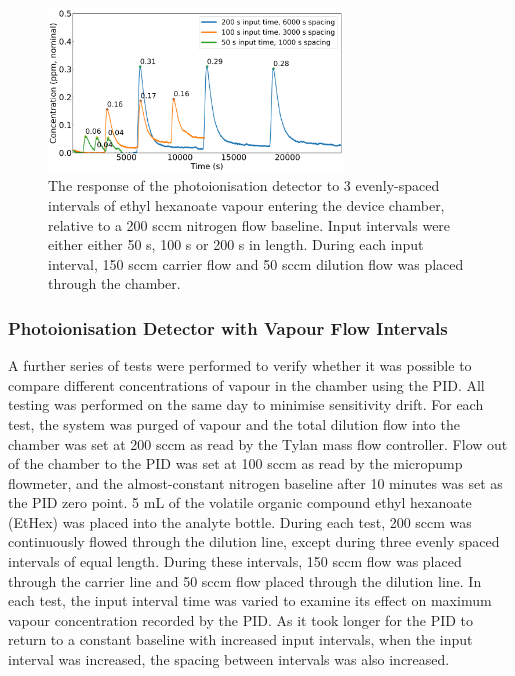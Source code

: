 \documentclass[
  a4paper,
]{scrbook}
\begin{document}
\begin{figure}

{\centering \includegraphics[width=0.7\textwidth,height=\textheight]{figures/ch5/input_time_comparison.png}

}

\caption{\label{fig-concentration-comparison}The response of the
photoionisation detector to 3 evenly-spaced intervals of ethyl hexanoate
vapour entering the device chamber, relative to a 200 sccm nitrogen flow
baseline. Input intervals were either either 50 s, 100 s or 200 s in
length. During each input interval, 150 sccm carrier flow and 50 sccm
dilution flow was placed through the chamber.}

\end{figure}

\hypertarget{photoionisation-detector-with-vapour-flow-intervals}{%
\subsubsection*{Photoionisation Detector with Vapour Flow
Intervals}\label{photoionisation-detector-with-vapour-flow-intervals}}

A further series of tests were performed to verify whether it was
possible to compare different concentrations of vapour in the chamber
using the PID. All testing was performed on the same day to minimise
sensitivity drift. For each test, the system was purged of vapour and
the total dilution flow into the chamber was set at 200 sccm as read by
the Tylan mass flow controller. Flow out of the chamber to the PID was
set at 100 sccm as read by the micropump flowmeter, and the
almost-constant nitrogen baseline after 10 minutes was set as the PID
zero point. 5 mL of the volatile organic compound ethyl hexanoate
(EtHex) was placed into the analyte bottle. During each test, 200 sccm
was continuously flowed through the dilution line, except during three
evenly spaced intervals of equal length. During these intervals, 150
sccm flow was placed through the carrier line and 50 sccm flow placed
through the dilution line. In each test, the input interval time was
varied to examine its effect on maximum vapour concentration recorded by
the PID. As it took longer for the PID to return to a constant baseline
with increased input intervals, when the input interval was increased,
the spacing between intervals was also increased.
\end{document}
